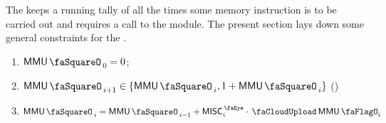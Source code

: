 The \mmuStamp{} keeps a running tally of all the times some memory instruction is to be carried out and requires a call to the \mmuMod{} module. The present section lays down some general constraints for the \mmuStamp{}.
\begin{enumerate}
	\item $\mmuStamp_{0} = 0$;
	\item $\mmuStamp_{i + 1} \in \{ \mmuStamp_{i}, 1 + \mmuStamp_{i} \}$ (\trash)
	\item $\mmuStamp_{i} = \mmuStamp_{i - 1} + \peekMisc_{i} \cdot \miscMmuFlag_{i}$
\end{enumerate}
